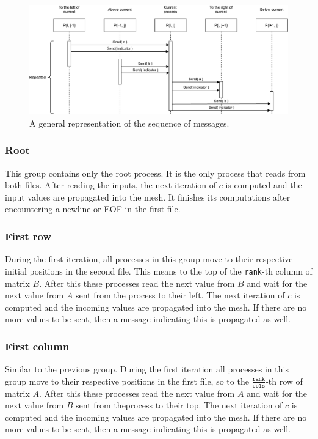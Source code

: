 \documentclass[pdftex, 11pt, a4paper, titlepage]{article}
\begin{document}
    \begin{figure}[h]
        \centering
        \includegraphics[scale=0.8]{sequence_diagram.pdf}
        \caption{A general representation of the sequence of messages.}
        \label{fig:sequence_diagram}
    \end{figure}

    \subsubsection*{Root}
    This group contains only the root process. It is the only process that reads from
    both files. After reading the inputs, the next iteration of $c$ is computed and
    the input values are propagated into the mesh. It finishes its computations after
    encountering a newline or EOF in the first file.

    \subsubsection*{First row}
    During the first iteration, all processes in this group move to their respective
    initial positions in the second file. This means to the top of the \texttt{rank}-th
    column of matrix $B$. After this these processes read the next value from $B$ and
    wait for the next value from $A$ sent from the process to their left.
    The next iteration of $c$ is computed and the incoming values are propagated into
    the mesh. If there are no more values to be sent, then a message indicating this
    is propagated as well.

    \subsubsection*{First column}
    Similar to the previous group. During the first iteration all processes in this
    group move to their respective positions in the first file, so to
    the $\frac{\texttt{rank}}{\texttt{cols}}$-th row of matrix $A$. After this these
    processes read the next value from $A$ and wait for the next value from $B$ sent
    from theprocess to their top. The next iteration of $c$ is computed and the
    incoming values are propagated into the mesh. If there are no more values
    to be sent, then a message indicating this is propagated as well.
\end{document}
